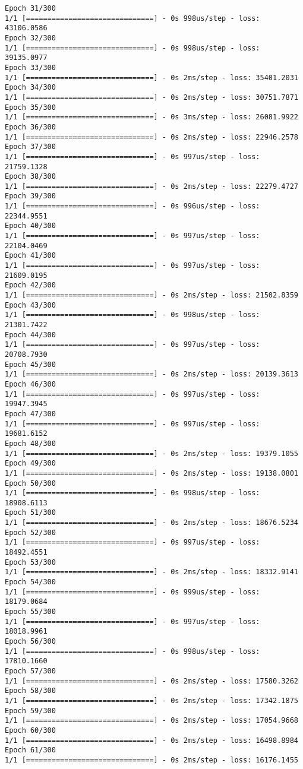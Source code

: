 \documentclass[11pt]{article}
\begin{document}
\begin{Verbatim}[commandchars=\\\{\}]
Epoch 31/300
1/1 [==============================] - 0s 998us/step - loss: 43106.0586
Epoch 32/300
1/1 [==============================] - 0s 998us/step - loss: 39135.0977
Epoch 33/300
1/1 [==============================] - 0s 2ms/step - loss: 35401.2031
Epoch 34/300
1/1 [==============================] - 0s 2ms/step - loss: 30751.7871
Epoch 35/300
1/1 [==============================] - 0s 3ms/step - loss: 26081.9922
Epoch 36/300
1/1 [==============================] - 0s 2ms/step - loss: 22946.2578
Epoch 37/300
1/1 [==============================] - 0s 997us/step - loss: 21759.1328
Epoch 38/300
1/1 [==============================] - 0s 2ms/step - loss: 22279.4727
Epoch 39/300
1/1 [==============================] - 0s 996us/step - loss: 22344.9551
Epoch 40/300
1/1 [==============================] - 0s 997us/step - loss: 22104.0469
Epoch 41/300
1/1 [==============================] - 0s 997us/step - loss: 21609.0195
Epoch 42/300
1/1 [==============================] - 0s 2ms/step - loss: 21502.8359
Epoch 43/300
1/1 [==============================] - 0s 998us/step - loss: 21301.7422
Epoch 44/300
1/1 [==============================] - 0s 997us/step - loss: 20708.7930
Epoch 45/300
1/1 [==============================] - 0s 2ms/step - loss: 20139.3613
Epoch 46/300
1/1 [==============================] - 0s 997us/step - loss: 19947.3945
Epoch 47/300
1/1 [==============================] - 0s 997us/step - loss: 19681.6152
Epoch 48/300
1/1 [==============================] - 0s 2ms/step - loss: 19379.1055
Epoch 49/300
1/1 [==============================] - 0s 2ms/step - loss: 19138.0801
Epoch 50/300
1/1 [==============================] - 0s 998us/step - loss: 18908.6113
Epoch 51/300
1/1 [==============================] - 0s 2ms/step - loss: 18676.5234
Epoch 52/300
1/1 [==============================] - 0s 997us/step - loss: 18492.4551
Epoch 53/300
1/1 [==============================] - 0s 2ms/step - loss: 18332.9141
Epoch 54/300
1/1 [==============================] - 0s 999us/step - loss: 18179.0684
Epoch 55/300
1/1 [==============================] - 0s 997us/step - loss: 18018.9961
Epoch 56/300
1/1 [==============================] - 0s 998us/step - loss: 17810.1660
Epoch 57/300
1/1 [==============================] - 0s 2ms/step - loss: 17580.3262
Epoch 58/300
1/1 [==============================] - 0s 2ms/step - loss: 17342.1875
Epoch 59/300
1/1 [==============================] - 0s 2ms/step - loss: 17054.9668
Epoch 60/300
1/1 [==============================] - 0s 2ms/step - loss: 16498.8984
Epoch 61/300
1/1 [==============================] - 0s 2ms/step - loss: 16176.1455

\end{Verbatim}
\end{document}
